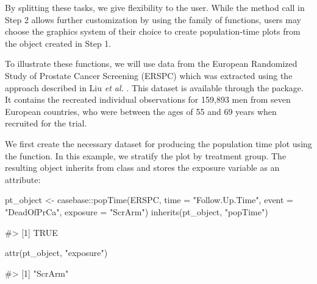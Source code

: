 By splitting these tasks, we give flexibility to the user. While the
method call in Step 2 allows further customization by using the
 \citep{ggplot2} family of functions, users may choose
the graphics system of their choice to create population-time plots from
the object created in Step 1.

To illustrate these functions, we will use data from the European
Randomized Study of Prostate Cancer Screening (ERSPC)
\citep{schroder2009screening} which was extracted using the approach
described in Liu \emph{et al.} \citeyearpar{liu2014recovering}. This
dataset is available through the  package. It contains the
recreated individual observations for 159,893 men from seven European
countries, who were between the ages of 55 and 69 years when recruited
for the trial.

We first create the necessary dataset for producing the population time
plot using the  function. In this example, we stratify the
plot by treatment group. The resulting object inherits from class
 and stores the exposure variable as an attribute:

\begin{Schunk}
\begin{Sinput}
pt_object <- casebase::popTime(ERSPC, time = "Follow.Up.Time",
                               event = "DeadOfPrCa", exposure = "ScrArm")
inherits(pt_object, "popTime")
\end{Sinput}
\begin{Soutput}
#> [1] TRUE
\end{Soutput}
\begin{Sinput}
attr(pt_object, "exposure")
\end{Sinput}
\begin{Soutput}
#> [1] "ScrArm"
\end{Soutput}
\end{Schunk}


